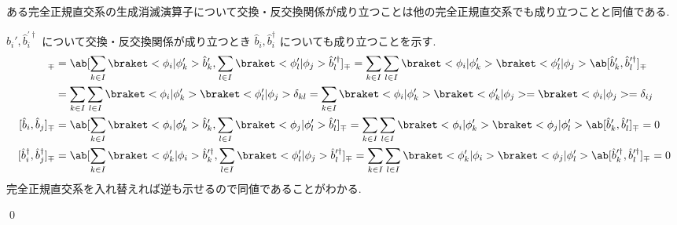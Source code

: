 \documentclass[uplatex,dvipdfmx,a4paper,11pt]{jlreq}
\makeatletter
\numberwithin{equation}{section}
\theoremstyle{definition}
\renewenvironment{proof}[1][\proofname]{\par
  \normalfont
  \topsep6\p@\@plus6\p@ \trivlist
  \item[\hskip\labelsep{\bfseries #1}\@addpunct{\bfseries}]\ignorespaces\quad\par
}{
  \qed\endtrivlist\@endpefalse
}
\renewcommand\proofname{証明}
\makeatother
\begin{document}
\begin{proposition}[Q21-80]
  ある完全正規直交系の生成消滅演算子について交換・反交換関係が成り立つことは他の完全正規直交系でも成り立つことと同値である.
\end{proposition}
\begin{proof}
  $\hat{b}_i', \hat{b}_i^{\prime\dagger}$ について交換・反交換関係が成り立つとき $\hat{b}_i, \hat{b}_i^\dagger$ についても成り立つことを示す.
  \begin{align}
    [\hat{b}_i, \hat{b}_j^\dagger]_\mp         & = \ab[\sum_{k\in I}\braket<\phi_i|\phi_k'>\hat{b}_k', \sum_{l\in I}\braket<\phi_l'|\phi_j>\hat{b}_l^{\prime\dagger}]_\mp = \sum_{k\in I}\sum_{l\in I}\braket<\phi_i|\phi_k'>\braket<\phi_l'|\phi_j>\ab[\hat{b}_k', \hat{b}_l^{\prime\dagger}]_\mp                                   \\
                                               & = \sum_{k\in I}\sum_{l\in I}\braket<\phi_i|\phi_k'>\braket<\phi_l'|\phi_j>\delta_{kl} = \sum_{k\in I}\braket<\phi_i|\phi_k'>\braket<\phi_k'|\phi_j> = \braket<\phi_i|\phi_j> = \delta_{ij}                                                                                          \\
    [\hat{b}_i, \hat{b}_j]_\mp                 & = \ab[\sum_{k\in I}\braket<\phi_i|\phi_k'>\hat{b}_k', \sum_{l\in I}\braket<\phi_j|\phi_l'>\hat{b}_l']_\mp = \sum_{k\in I}\sum_{l\in I}\braket<\phi_i|\phi_k'>\braket<\phi_j|\phi_l'>\ab[\hat{b}_k', \hat{b}_l']_\mp = 0                                                             \\
    [\hat{b}_i^\dagger, \hat{b}_j^\dagger]_\mp & = \ab[\sum_{k\in I}\braket<\phi_k'|\phi_i>\hat{b}_k^{\prime\dagger}, \sum_{l\in I}\braket<\phi_l'|\phi_j>\hat{b}_l^{\prime\dagger}]_\mp = \sum_{k\in I}\sum_{l\in I}\braket<\phi_k'|\phi_i>\braket<\phi_j|\phi_l'>\ab[\hat{b}_k^{\prime\dagger}, \hat{b}_l^{\prime\dagger}]_\mp = 0
  \end{align}
  完全正規直交系を入れ替えれば逆も示せるので同値であることがわかる.
\end{proof}
\end{document}
